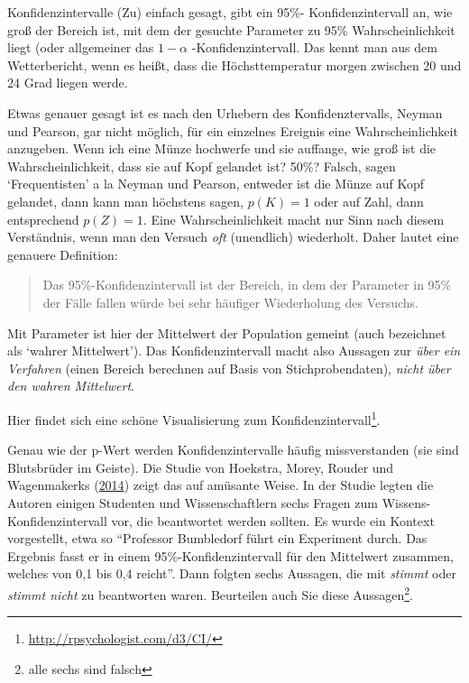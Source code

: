 \documentclass[12pt,ngerman,]{book}
\let\rmarkdownfootnote\footnote%
\def\footnote{\protect\rmarkdownfootnote}
\renewcommand{\href}[2]{#2\footnote{\url{#1}}}
\theoremstyle{definition}
\theoremstyle{definition}
\theoremstyle{remark}
\begin{document}
Konfidenzintervalle (Zu) einfach gesagt, gibt
ein 95\%- Konfidenzintervall an, wie groß der Bereich ist, mit dem der
gesuchte Parameter zu 95\% Wahrscheinlichkeit liegt (oder allgemeiner
das \(1-\alpha\) -Konfidenzintervall. Das kennt man aus dem
Wetterbericht, wenn es heißt, dass die Höchsttemperatur morgen zwischen
20 und 24 Grad liegen werde.

Etwas genauer gesagt ist es nach den Urhebern des Konfidenztervalls,
Neyman und Pearson, gar nicht möglich, für ein einzelnes Ereignis eine
Wahrscheinlichkeit anzugeben. Wenn ich eine Münze hochwerfe und sie
auffange, wie groß ist die Wahrscheinlichkeit, dass sie auf Kopf
gelandet ist? 50\%? Falsch, sagen `Frequentisten' a la Neyman und
Pearson, entweder ist die Münze auf Kopf gelandet, dann kann man
höchstens sagen, \(p(K)=1\) oder auf Zahl, dann entsprechend \(p(Z)=1\).
Eine Wahrscheinlichkeit macht nur Sinn nach diesem Verständnis, wenn man
den Versuch \emph{oft} (unendlich) wiederholt. Daher lautet eine
genauere Definition:

\begin{quote}
Das 95\%-Konfidenzintervall ist der Bereich, in dem der Parameter in
95\% der Fälle fallen würde bei sehr häufiger Wiederholung des Versuchs.
\end{quote}

Mit Parameter ist hier der Mittelwert der Population gemeint (auch
bezeichnet als `wahrer Mittelwert'). Das Konfidenzintervall macht also
Aussagen zur \emph{über ein Verfahren} (einen Bereich berechnen auf
Basis von Stichprobendaten), \emph{nicht über den wahren Mittelwert}.

Hier findet sich eine schöne
\href{http://rpsychologist.com/d3/CI/}{Visualisierung zum
Konfidenzintervall}.

Genau wie der p-Wert werden Konfidenzintervalle häufig missverstanden
(sie sind Blutsbrüder im Geiste). Die Studie von Hoekstra, Morey, Rouder
und Wagenmakerks (\protect\hyperlink{ref-hoekstra2014robust}{2014})
zeigt das auf amüsante Weise. In der Studie legten die Autoren einigen
Studenten und Wissenschaftlern sechs Fragen zum
Wissens-Konfidenzintervall vor, die beantwortet werden sollten. Es wurde
ein Kontext vorgestellt, etwa so ``Professor Bumbledorf führt ein
Experiment durch. Das Ergebnis fasst er in einem 95\%-Konfidenzintervall
für den Mittelwert zusammen, welches von 0,1 bis 0,4 reicht''. Dann
folgten sechs Aussagen, die mit \emph{stimmt} oder \emph{stimmt nicht}
zu beantworten waren. Beurteilen auch Sie diese Aussagen\footnote{alle
  sechs sind falsch}.
\end{document}
